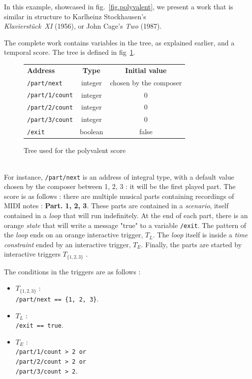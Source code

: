\documentclass{article}
\newcommand{\scenario}{\textit{scenario}\xspace}
\newcommand{\Loop}{\textit{loop}\xspace}
\newcommand{\state}{\textit{state}\xspace}
\newcommand{\timeconstraint}{\textit{time constraint}\xspace}
\begin{document}
In this example, showcased in fig.~\ref{fig.polyvalent}, we present a work that is similar in structure to Karlheinz Stockhausen's~\\ \emph{Klavierstück~XI} (1956), or John Cage's \emph{Two} (1987). 

The complete work contains variables in the tree, as explained earlier, and a temporal score.
The tree is defined in fig~\ref{fig.tablescore}.
\begin{figure}[h]
    \begin{tabular}{lcc}        
        \textbf{Address} & \textbf{Type} & \textbf{Initial value} \\
        \lstinline|/part/next|    & integer & chosen by the composer \\
        \lstinline|/part/1/count| & integer & 0 \\
        \lstinline|/part/2/count| & integer & 0 \\
        \lstinline|/part/3/count| & integer & 0 \\
        \lstinline|/exit|         & boolean & false
    \end{tabular}
    \caption{Tree used for the polyvalent score}
    \label{fig.tablescore}
\end{figure}~\\
For instance, \lstinline{/part/next} is an address of integral type, with a default value chosen by the composer between 1, 2, 3 : it will be the first played part. 
The score is as follows : there are multiple musical parts containing recordings of MIDI notes : \textbf{Part. 1, 2, 3}.
These parts are contained in a \scenario, itself contained in a \Loop that will run indefinitely. 
At the end of each part, there is an orange \state that will write a message "true" to a variable \lstinline{/exit}.
The pattern of the \Loop ends on an orange interactive trigger, $T_{L}$.
The \Loop itself is inside a \timeconstraint ended by an interactive trigger, $T_{E}$.
Finally, the parts are started by interactive triggers  $T_{\{1, 2, 3\}}$ .
 
The conditions in the triggers are as follows : 
\begin{itemize}
\item  $T_{\{1, 2, 3\}}$ : ~\\ \lstinline|/part/next == {1, 2, 3}|.
\item $T_{L}$ : ~\\ \lstinline{/exit == true}.
\item $T_{E}$ : ~\\
\lstinline{/part/1/count > 2 or} \\
\lstinline{/part/2/count > 2 or} \\
\lstinline{/part/3/count > 2}.
\end{itemize}
\end{document}
